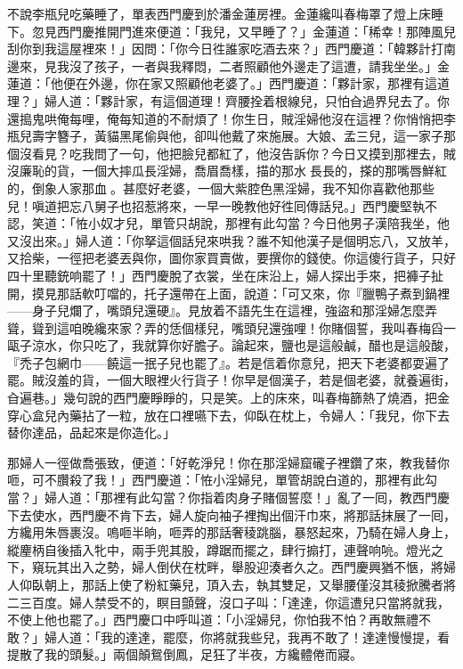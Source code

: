 不說李瓶兒吃藥睡了，單表西門慶到於潘金蓮房裡。金蓮纔叫春梅罩了燈上床睡下。忽見西門慶推開門進來便道：{}「我兒，又早睡了？」金蓮道：「稀幸！那陣風兒刮你到我這屋裡來！」因問：「你今日徃誰家吃酒去來？」西門慶道：「韓夥計打南邊來，見我沒了孩子，一者與我釋悶，二者照顧他外邊走了這遭，請我坐坐。」金蓮道：「他便在外邊，你在家又照顧他老婆了。」西門慶道：「夥計家，那裡有這道理？」婦人道：「夥計家，有這個道理！齊腰拴着根線兒，只怕㒲過界兒去了。你還搗鬼哄俺每哩，俺每知道的不耐煩了！你生日，賊淫婦他沒在這裡？你悄悄把李瓶兒壽字簪子，{}黃貓黑尾偷與他，卻叫他戴了來施展。大娘、孟三兒，這一家子那個沒看見？吃我問了一句，他把臉兒都紅了，他沒告訴你？今日又摸到那裡去，賊沒廉恥的貨，一個大摔瓜長淫婦，喬眉喬樣，描的那水𩬆長長的，搽的那嘴唇鮮紅的，倒象人家那血𣬼。甚麼好老婆，一個大紫腔色黑淫婦，我不知你喜歡他那些兒！{}嗔道把忘八舅子也招惹將來，一早一晚教他好徃囘傳話兒。」西門慶堅執不認，笑道：「恠小奴才兒，單管只胡說，那裡有此勾當？今日他男子漢陪我坐，他又沒出來。」婦人道：「你拏這個話兒來哄我？誰不知他漢子是個明忘八，又放羊，又拾柴，一徑把老婆丟與你，圖你家買賣做，要撰你的錢使。{}你這傻行貨子，只好四十里聽銃响罷了！」西門慶脫了衣裳，坐在床沿上，婦人探出手來，把褲子扯開，{}摸見那話軟叮噹的，托子還帶在上面，說道：「可又來，你『臘鴨子煮到鍋裡——身子兒爛了，嘴頭兒還硬』。見放着不語先生在這裡，{}強盜和那淫婦怎麼弄聳，聳到這咱晚纔來家？弄的恁個樣兒，嘴頭兒還強哩！你賭個誓，我叫春梅舀一甌子涼水，你只吃了，我就算你好膽子。{}論起來，鹽也是這般鹹，醋也是這般酸，『禿子包網巾——饒這一抿子兒也罷了』。若是信着你意兒，把天下老婆都耍遍了罷。賊沒羞的貨，一個大眼裡火行貨子！你早是個漢子，若是個老婆，就養遍街，㒲遍巷。」幾句說的西門慶睜睜的，只是笑。上的床來，叫春梅篩熱了燒酒，把金穿心盒兒內藥拈了一粒，放在口裡嚥下去，仰臥在枕上，令婦人：「我兒，你下去替你達品，品起來是你造化。」

那婦人一徑做喬張致，便道：「好乾淨兒！你在那淫婦窟礲子裡鑽了來，教我替你咂，可不臢殺了我！」西門慶道：「恠小淫婦兒，單管胡說白道的，那裡有此勾當？」婦人道：「那裡有此勾當？你指着肉身子賭個誓麼！」亂了一囘，教西門慶下去使水，西門慶不肯下去，婦人旋向袖子裡掏出個汗巾來，將那話抹展了一囘，{}方纔用朱唇裹沒。{}嗚咂半晌，咂弄的那話奢稜跳腦，暴怒起來，乃騎在婦人身上，縱麈柄自後插入牝中，兩手兜其股，蹲踞而擺之，肆行搧打，連聲响喨。燈光之下，窺玩其出入之勢，婦人倒伏在枕畔，舉股迎湊者久之。西門慶興猶不愜，將婦人仰臥朝上，那話上使了粉紅藥兒，頂入去，執其雙足，又舉腰僅沒其稜掀騰者將二三百度。婦人禁受不的，瞑目顫聲，沒口子叫：「達達，你這遭兒只當將就我，不使上他也罷了。」西門慶口中呼叫道：「小淫婦兒，你怕我不怕？再敢無禮不敢？」婦人道：「我的達達，罷麼，你將就我些兒，我再不敢了！達達慢慢提，看提散了我的頭髮。」兩個顛鴛倒鳳，足狂了半夜，方纔體倦而寢。

